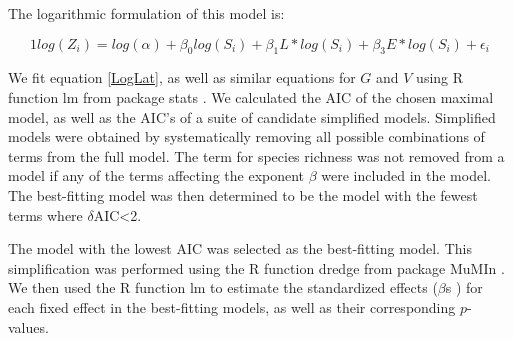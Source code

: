 \documentclass[12pt]{article}
\begin{document}
The logarithmic formulation of this model is:

\begin{equation}
\label{LogLat}
1log(Z_{i})= log(\alpha)+\beta_{0}log(S_{i}) + \beta_{1}L*log(S_{i}) +\beta_{3}E*log(S_{i}) +\epsilon_{i}
\end{equation}


We fit equation \ref{LogLat}, as well as similar equations for $G$ and $V$ using R \citep{R} function lm from package stats
\citep{stats}.
We calculated the AIC of the chosen maximal model, as well as the AIC's of a suite of candidate simplified models.
Simplified models were obtained by systematically removing all possible combinations of terms from the full model.
The term for species richness was not removed from a model if any of the terms affecting the exponent $\beta$ were 
included in the model. The best-fitting model was then determined to be the model with the fewest terms where $\delta$AIC<2. 

The model with the lowest AIC was selected as the best-fitting model. 
This simplification was performed using the
R \citep{R} function dredge from package MuMIn \citep{MuMIn}. We then used the R \citep{R} function lm
to estimate the standardized effects ($\beta$s ) for each fixed effect in the 
best-fitting models, as well as their corresponding $p$-values. 



\end{document}
